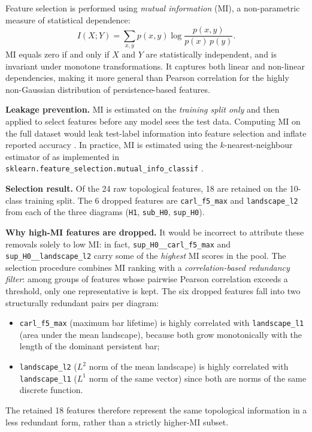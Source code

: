\documentclass[12pt, a4paper]{article}
\theoremstyle{definition}
\theoremstyle{plain}
\begin{document}
Feature selection is performed using \emph{mutual information} (MI), a
non-parametric measure of statistical dependence:
\begin{equation}
  I(X; Y) = \sum_{x,y} p(x, y) \log \frac{p(x,y)}{p(x)\,p(y)}.
  \label{eq:mi}
\end{equation}
MI equals zero if and only if $X$ and $Y$ are statistically independent, and
is invariant under monotone transformations. It captures both linear and
non-linear dependencies, making it more general than Pearson correlation for
the highly non-Gaussian distribution of persistence-based features.

\medskip
\noindent
\textbf{Leakage prevention.} MI is estimated on the \emph{training split only}
and then applied to select features before any model sees the test data. Computing
MI on the full dataset would leak test-label information into feature selection and
inflate reported accuracy \citep{kaufman2012leakage}. In practice, MI is estimated
using the $k$-nearest-neighbour estimator of \citet{kraskov2004estimating} as
implemented in \texttt{sklearn.feature\_selection.mutual\_info\_classif}
\citep{pedregosa2011scikit}.

\medskip
\noindent
\textbf{Selection result.} Of the 24 raw topological features, 18 are retained
on the 10-class training split. The 6 dropped features are
\texttt{carl\_f5\_max} and \texttt{landscape\_l2} from each of the three
diagrams (\texttt{H1}, \texttt{sub\_H0}, \texttt{sup\_H0}).

\medskip\noindent
\textbf{Why high-MI features are dropped.} It would be incorrect to attribute
these removals solely to low MI: in fact, \texttt{sup\_H0\_\_carl\_f5\_max}
and \texttt{sup\_H0\_\_landscape\_l2} carry some of the \emph{highest} MI scores
in the pool. The selection procedure combines MI ranking with a
\emph{correlation-based redundancy filter}: among groups of features whose pairwise
Pearson correlation exceeds a threshold, only one representative is kept. The
six dropped features fall into two structurally redundant pairs per diagram:
\begin{itemize}[nosep]
  \item \texttt{carl\_f5\_max} (maximum bar lifetime) is highly correlated with
    \texttt{landscape\_l1} (area under the mean landscape), because both grow
    monotonically with the length of the dominant persistent bar;
  \item \texttt{landscape\_l2} ($L^2$ norm of the mean landscape) is highly
    correlated with \texttt{landscape\_l1} ($L^1$ norm of the same vector) since
    both are norms of the same discrete function.
\end{itemize}
The retained 18 features therefore represent the same topological information
in a less redundant form, rather than a strictly higher-MI subset.
\end{document}
